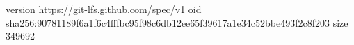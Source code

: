 version https://git-lfs.github.com/spec/v1
oid sha256:90781189f6a1f6c4fffbc95f98c6db12ee65f39617a1e34c52bbe493f2c8f203
size 349692
